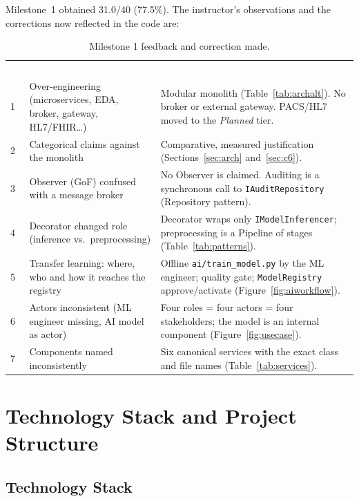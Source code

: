\documentclass[12pt,a4paper]{article}
\newcommand{\hd}[1]{\textcolor{white}{\textbf{#1}}}
\begin{document}
Milestone~1 obtained 31.0/40 (77.5\%). The instructor's observations and the corrections now reflected
in the code are:

\begin{table}[H]
\centering
\caption{Milestone 1 feedback and correction made.}
\label{tab:m1corr}
\renewcommand{\arraystretch}{1.3}
\begin{tabularx}{\textwidth}{C{0.4cm} L{4.4cm} Y}
\hd{\#} & \hd{Milestone 1 feedback} & \hd{Correction / improvement made} \\
1 & Over-engineering (microservices, EDA, broker, gateway, HL7/FHIR\ldots) & Modular monolith (Table~\ref{tab:archalt}). No broker or external gateway. PACS/HL7 moved to the \emph{Planned} tier. \\
2 & Categorical claims against the monolith & Comparative, measured justification (Sections~\ref{sec:arch} and~\ref{sec:c6}). \\
3 & Observer (GoF) confused with a message broker & No Observer is claimed. Auditing is a synchronous call to \texttt{IAuditRepository} (Repository pattern). \\
4 & Decorator changed role (inference vs.\ preprocessing) & Decorator wraps only \texttt{IModelInferencer}; preprocessing is a Pipeline of stages (Table~\ref{tab:patterns}). \\
5 & Transfer learning: where, who and how it reaches the registry & Offline \texttt{ai/train\_model.py} by the ML engineer; quality gate; \texttt{ModelRegistry} approve/activate (Figure~\ref{fig:aiworkflow}). \\
6 & Actors inconsistent (ML engineer missing, AI model as actor) & Four roles = four actors = four stakeholders; the model is an internal component (Figure~\ref{fig:usecase}). \\
7 & Components named inconsistently & Six canonical services with the exact class and file names (Table~\ref{tab:services}). \\
\end{tabularx}
\end{table}

\section{Technology Stack and Project Structure}

\subsection{Technology Stack}
\end{document}

